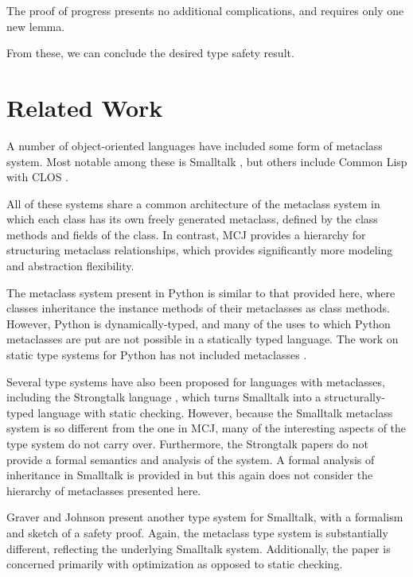 \documentclass{acm-sigplan}
\begin{document}
The proof of progress presents no additional complications, and
requires only one new lemma.

\fieldsAgreeLemma

\progress

\progressProof

From these, we can conclude the desired type safety result.

\soundness

\soundnessProofShort


\section{Related Work}
\label{related}

A number of object-oriented languages have included some form of
metaclass system. Most notable among these is Smalltalk
\cite{Smalltalk80}, but others include Common Lisp with CLOS
\cite{ArtMOP}.

All of these systems share a common architecture of the metaclass system
in which each class has its own freely generated metaclass, defined by
the class methods and fields of the class.  In contrast, MCJ
provides a hierarchy for structuring metaclass relationships, which
provides significantly more modeling and abstraction flexibility.

The metaclass system present in Python \cite{PythonMeta} is
similar to that provided here, where classes inheritance the instance methods
of their metaclasses as class methods.  However,
Python is dynamically-typed, and many of the uses to which Python
metaclasses are put are not possible in a statically typed language.
The work on static type systems for Python has not included
metaclasses \cite{Starkiller}.

Several type systems have also been proposed for languages with
metaclasses, including the Strongtalk language \cite{Strongtalk},
which turns Smalltalk into a structurally-typed language with
static checking.  However, because the Smalltalk metaclass
system is so different from the one in MCJ, many of the interesting
aspects of the type system do not carry over.  Furthermore, the
Strongtalk papers do not provide a formal semantics and analysis of
the system.  A formal analysis of inheritance in Smalltalk is provided
in \cite{cook:thesis} but this again does not consider the hierarchy
of metaclasses presented here.

Graver and Johnson \cite{graver:90} present another type system for
Smalltalk, with a formalism and sketch of a safety proof.  Again, the
metaclass type system is substantially different, reflecting the
underlying Smalltalk system.  Additionally, the paper is concerned
primarily with optimization as opposed to static checking.
\end{document}
